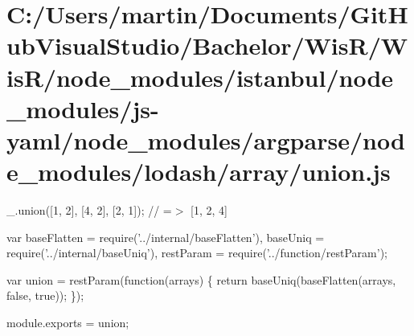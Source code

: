 \hypertarget{_c_1_2_users_2martin_2_documents_2_git_hub_visual_studio_2_bachelor_2_wis_r_2_wis_r_2node_module078541c762ecf82a7e964218681e4d05}{}\section{C\+:/\+Users/martin/\+Documents/\+Git\+Hub\+Visual\+Studio/\+Bachelor/\+Wis\+R/\+Wis\+R/node\+\_\+modules/istanbul/node\+\_\+modules/js-\/yaml/node\+\_\+modules/argparse/node\+\_\+modules/lodash/array/union.\+js}
\+\_\+.\+union(\mbox{[}1, 2\mbox{]}, \mbox{[}4, 2\mbox{]}, \mbox{[}2, 1\mbox{]}); // =$>$ \mbox{[}1, 2, 4\mbox{]}


\begin{DoxyCodeInclude}
var baseFlatten = require(\textcolor{stringliteral}{'../internal/baseFlatten'}),
    baseUniq = require(\textcolor{stringliteral}{'../internal/baseUniq'}),
    restParam = require(\textcolor{stringliteral}{'../function/restParam'});

var \textcolor{keyword}{union }= restParam(function(arrays) \{
  \textcolor{keywordflow}{return} baseUniq(baseFlatten(arrays, \textcolor{keyword}{false}, \textcolor{keyword}{true}));
\});

module.exports = \textcolor{keyword}{union};
\end{DoxyCodeInclude}
 